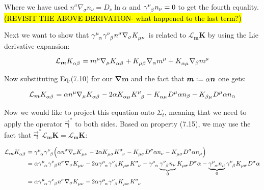 \documentclass[12pt]{article}
\renewcommand{\vec}[1]{\bm{#1}}
\numberwithin{equation}{section}
\numberwithin{theorem}{subsection}
\newcommand{\defeq}{\vcentcolon=}
\begin{document}
Where we have used $n^{\sigma}\nabla_{\sigma}n_{\nu} = D_{\nu}\ln{\alpha}$ and $\tensor{\gamma}{^\nu_\beta}n_{\nu} = 0$ to get the fourth equality. \hl{(REVISIT THE ABOVE DERIVATION- what happened to the last term?)}

Next we want to show that $\tensor{\gamma}{^\mu_\alpha}\tensor{\gamma}{^\nu_\beta}n^{\sigma}\nabla_{\sigma}\tensor{K}{_\mu_\nu}$ is related to $\mathcal{L}_{\vec{m}}\vec{K}$ by using the Lie derivative expansion:

\begin{equation*}

    \mathcal{L}_{\vec{m}}\tensor{K}{_\alpha_\beta} = m^{\mu}\nabla_{\mu}\tensor{K}{_\alpha_\beta} + \tensor{K}{_\mu_\beta}\nabla_{\alpha}m^{\mu}+\tensor{K}{_\alpha_\mu}\nabla_{\beta}m^{\mu}

\end{equation*}

Now substituting Eq.(7.10) for our $\vec{\nabla m}$ and the fact that $\vec{m} \defeq \alpha \vec{n}$ one gets:

\begin{equation*}

    \mathcal{L}_{\vec{m}}\tensor{K}{_\alpha_\beta} = \alpha n^{\mu}\nabla_{\mu}\tensor{K}{_\alpha_\beta} -2\alpha\tensor{K}{_\alpha_\mu}\tensor{K}{^\mu_\beta}-\tensor{K}{_\alpha_\mu}D^{\mu}\alpha n_{\beta} - \tensor{K}{_\beta_\mu}D^{\mu}\alpha n_{\alpha} 

\end{equation*}

Now we would like to project this equation onto $\Sigma_{t}$, meaning that we need to apply the operator $\overrightarrow{\vec{\gamma}}^{*}$ to both sides. Based on property (7.15), we may use the fact that $\overrightarrow{\vec{\gamma}}^{*} \mathcal{L}_{\vec{m}}\vec{K} = \mathcal{L}_{\vec{m}}\vec{K}$:

\begin{align}

    \mathcal{L}_{\vec{m}}\tensor{K}{_\alpha_\beta} &= \tensor{\gamma}{^\mu_\alpha}\tensor{\gamma}{^\nu_\beta}\Big(\alpha n^{\sigma}\nabla_{\sigma}\tensor{K}{_\mu_\nu} -2\alpha \tensor{K}{_\mu_\sigma}\tensor{K}{^\sigma_\nu} - \tensor{K}{_\mu_\sigma}D^{\sigma}\alpha n_{\nu}-\tensor{K}{_\mu_\sigma}D^{\sigma}\alpha n_{\mu} \Big) \notag \\

    &= \alpha \tensor{\gamma}{^\mu_\alpha}\tensor{\gamma}{^\nu_\beta}n^{\sigma}\nabla_{\sigma}\tensor{K}{_\mu_\nu} - 2\alpha\tensor{\gamma}{^\mu_\alpha}\tensor{\gamma}{^\nu_\beta}\tensor{K}{_\mu_\sigma}\tensor{K}{^\sigma_\nu} - \tensor{\gamma}{^\mu_\alpha}\underbrace{\tensor{\gamma}{^\nu_\beta}n_{\nu}}_{0}\tensor{K}{_\mu_\sigma}D^{\sigma}\alpha -\underbrace{\tensor{\gamma}{^\mu_\alpha}n_{\mu}}_{0}\tensor{\gamma}{^\nu_\beta}\tensor{K}{_\mu_\sigma}D^{\sigma}\alpha \notag \\

    &= \alpha \tensor{\gamma}{^\mu_\alpha}\tensor{\gamma}{^\nu_\beta}n^{\sigma}\nabla_{\sigma}\tensor{K}{_\mu_\nu} - 2\alpha\tensor{\gamma}{^\mu_\alpha}\tensor{\gamma}{^\nu_\beta}\tensor{K}{_\mu_\sigma}\tensor{K}{^\sigma_\nu}

\end{align}
\end{document}
